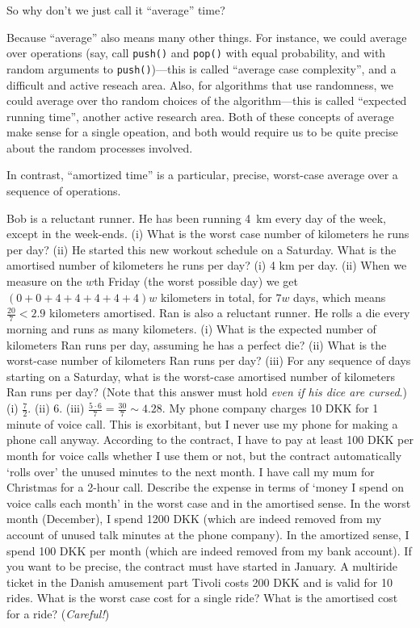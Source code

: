 \documentclass{tstextbook}
\begin{document}
So why don't we just call it ``average'' time?

Because ``average'' also means many other things. 
For instance, we could average over operations (say, call {\tt push()} and {\tt pop()} with equal probability, and with random arguments to {\tt push()})---this is called ``average case complexity'', and a difficult and active reseach area.
Also, for algorithms that use randomness, we could average over tho random choices of the algorithm---this is called ``expected running time'', another active research area.
Both of these concepts of average make sense for a single opeation, and both would require us to be quite precise about the random processes involved.

In contrast, ``amortized time'' is a particular, precise, worst-case average over a sequence of operations.

\begin{ExerciseList}
  \Exercise
  Bob is a reluctant runner. 
  He has been running 4~km every day of the week, except in the week-ends.
  (i) What is the worst case number of kilometers he runs per day?
  (ii) He started this new workout schedule on a Saturday.
  What is the amortised number of kilometers he runs per day?
  \Answer (i) 4 km per day.
  (ii) When we measure on the $w$th Friday (the worst possible day) we get $(0+0+4+4+4+4+4)w$ kilometers in total, for $7w$ days, which means $\frac{20}{7}<2.9$ kilometers amortised.
  \Exercise
  Ran is also a reluctant runner.
  He rolls a die every morning and runs as many kilometers.
  (i) What is the expected number of kilometers Ran runs per day, assuming he has a perfect die?
  (ii) What is the worst-case number of kilometers Ran runs per day?
  (iii) For any sequence of days starting on a Saturday, what is the worst-case amortised number of kilometers Ran runs per day? (Note that this answer must hold \emph{even if his dice are cursed}.)
  \Answer
  (i) $\frac{7}{2}$. (ii) $6$. (iii) $\frac{5\cdot 6}{7} = \frac{30}{7} \sim 4.28$.
  \Exercise
  My phone company charges 10 DKK for 1 minute of voice call.
  This is exorbitant, but I never use my phone for making a phone call anyway.
  According to the contract, I have to pay at least 100 DKK per month for voice calls whether I use them or not, but the contract automatically `rolls over' the unused minutes to the next month.
  I have call my mum for Christmas for a 2-hour call.
  Describe the expense in terms of `money I spend on voice calls each month' in the worst case and in the amortised sense.
  \Answer
  In the worst month (December), I spend 1200 DKK (which are indeed removed from my account of unused talk minutes at the phone company).
  In the amortized sense, I spend 100 DKK per month (which are indeed removed from my bank account).
  If you want to be precise, the contract must have started in January.
  \Exercise 
  A multiride ticket in the Danish amusement part Tivoli costs 200 DKK and is valid for 10 rides. 
  What is the worst case cost for a single ride? 
  What is the amortised cost for a ride?  
  (\emph{Careful!})
\end{ExerciseList}
\end{document}
